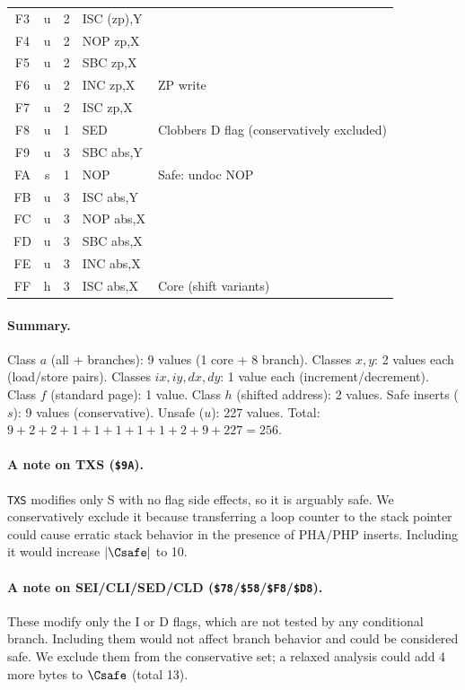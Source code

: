 \documentclass{article}
\newcommand{\hex}[1]{\texttt{\$#1}}
\newcommand{\opcode}[1]{\texttt{#1}}
\begin{document}
{\begin{longtable}{@{}ccclp{4.8cm}@{}}
F3 & u  & 2 & ISC (zp),Y & \\
F4 & u  & 2 & NOP zp,X & \\
F5 & u  & 2 & SBC zp,X & \\
F6 & u  & 2 & INC zp,X & ZP write \\
F7 & u  & 2 & ISC zp,X & \\
F8 & u  & 1 & SED & Clobbers D flag (conservatively excluded) \\
F9 & u  & 3 & SBC abs,Y & \\
FA & s  & 1 & NOP & Safe: undoc NOP \\
FB & u  & 3 & ISC abs,Y & \\
FC & u  & 3 & NOP abs,X & \\
FD & u  & 3 & SBC abs,X & \\
FE & u  & 3 & INC abs,X & \\
FF & h  & 3 & ISC abs,X & Core (shift variants) \\
\end{longtable}
}

\paragraph{Summary.}
Class $a$ (all + branches): 9 values (1 core + 8 branch).
Classes $x, y$: 2 values each (load/store pairs).
Classes $ix, iy, dx, dy$: 1 value each (increment/decrement).
Class $f$ (standard page): 1 value.
Class $h$ (shifted address): 2 values.
Safe inserts ($s$): 9 values (conservative).
Unsafe ($u$): 227 values.
Total: $9 + 2 + 2 + 1 + 1 + 1 + 1 + 1 + 2 + 9 + 227 = 256$.\ \checkmark

\paragraph{A note on TXS (\hex{9A}).}
\opcode{TXS} modifies only S with no flag side effects, so it is
arguably safe.  We conservatively exclude it because transferring a
loop counter to the stack pointer could cause erratic stack behavior
in the presence of PHA/PHP inserts.  Including it would increase
$|\Csafe|$ to 10.

\paragraph{A note on SEI/CLI/SED/CLD (\hex{78}/\hex{58}/\hex{F8}/\hex{D8}).}
These modify only the I or D flags, which are not tested by any
conditional branch.  Including them would not affect branch behavior
and could be considered safe.  We exclude them from the conservative
set; a relaxed analysis could add 4 more bytes to $\Csafe$ (total 13).
\end{document}
